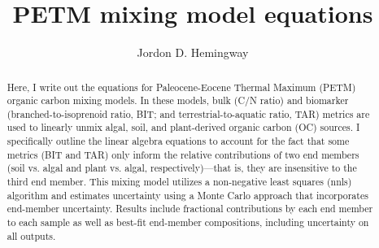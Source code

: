 \documentclass{amsart}
\title{PETM mixing model equations}
\author{Jordon D. Hemingway}
\begin{document}
\maketitle

\begin{abstract}
	Here, I write out the equations for Paleocene-Eocene Thermal Maximum (PETM) organic carbon mixing models. In these models, bulk (C/N ratio) and biomarker (branched-to-isoprenoid ratio, BIT; and terrestrial-to-aquatic ratio, TAR) metrics are used to linearly unmix algal, soil, and plant-derived organic carbon (OC) sources. I specifically outline the linear algebra equations to account for the fact that some metrics (BIT and TAR) only inform the relative contributions of two end members (soil vs. algal and plant vs. algal, respectively)---that is, they are insensitive to the third end member. This mixing model utilizes a non-negative least squares (nnls) algorithm and estimates uncertainty using a Monte Carlo approach that incorporates end-member uncertainty. Results include fractional contributions by each end member to each sample as well as best-fit end-member compositions, including uncertainty on all outputs.
\end{abstract}

\end{document}
